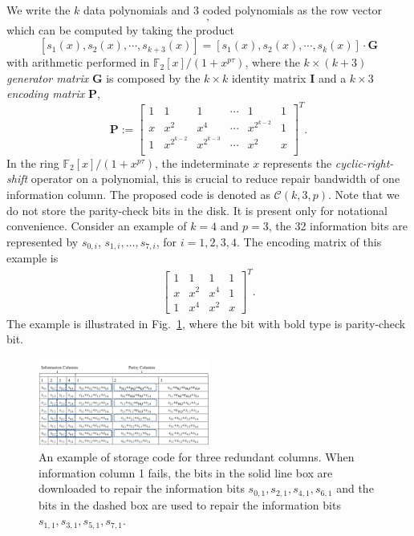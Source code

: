 \documentclass[conference]{IEEEtran}
\begin{document}
We write the $k$ data polynomials and $3$ coded polynomials as the row vector
\begin{equation}
[s_1(x),s_2(x),\cdots,s_{k+3}(x)],
\label{eq:data_clm}
\end{equation}
which can be computed by taking the product
\[
[s_1(x),s_2(x),\cdots,s_{k+3}(x)]= [s_1(x),s_2(x),\cdots,s_{k}(x)] \cdot \mathbf{G}
\]
with arithmetic performed in $\mathbb{F}_2[x]/(1+x^{p\tau})$,
where the $k\times (k+3)$ \emph{generator matrix} $\mathbf{G}$ is composed by the $k\times k$ identity matrix $\mathbf{I}$ and a $k\times 3$ \emph{encoding matrix} $\mathbf{P}$,
\[
\mathbf{P}:=
\begin{bmatrix}
 1&1&1 & \cdots & 1 &1\\
 x & x^{2} & x^{4}& \cdots & x^{2^{k-2}}&1\\
 1&x^{2^{k-2}}& x^{2^{k-3}}& \cdots & x^{2} & x \\
 \end{bmatrix}^T.
\label{matrixp}
\]
In the ring $\mathbb{F}_2[x]/(1+x^{p\tau})$, the indeterminate $x$ represents the \emph{cyclic-right-shift} operator on a polynomial, this is crucial to reduce repair bandwidth of one information column.
The proposed code is denoted as $\mathcal{C}(k,3,p)$. Note that we do not store the parity-check bits in the disk. It is present only for notational convenience. Consider an example of $k=4$ and $p=3$, the 32 information bits are represented by $s_{0,i}$, $s_{1,i}, \ldots, s_{7,i}$, for $i=1,2,3,4$. The encoding matrix of this example is
\begin{align*}
\begin{bmatrix}
1 & 1 & 1 & 1\\
x & x^2 & x^4 & 1 \\
1 & x^4 & x^2 & x
\end{bmatrix}^T.
\end{align*}
The example is illustrated in Fig.~\ref{example}, where the bit with bold type is parity-check bit.

\begin{figure}
\centering
\includegraphics[width=0.5\textwidth]{example2}
\caption{An example of storage code for three redundant columns. When information column 1 fails, the bits in the solid line box are downloaded to repair the information bits $s_{0,1},s_{2,1},s_{4,1},s_{6,1}$ and the bits in the dashed box are used to repair the information bits $s_{1,1},s_{3,1},s_{5,1},s_{7,1}$.}
\label{example}
\vspace{-0.5cm}
\end{figure}
\end{document}
